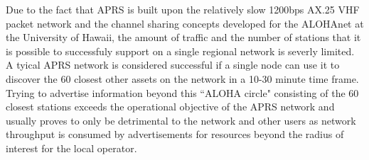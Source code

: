 Due to the fact that APRS is built upon the relatively slow 
1200bps AX.25 VHF packet
network and the channel sharing concepts developed for the ALOHAnet at
the University of Hawaii, the amount of 
traffic and the number of stations that it is possible to successfuly 
support on a single regional network is severly limited. 
A tyical APRS network is considered successful if a single node
can use it to discover the 60 closest other assets on the network in a
10-30 minute time frame. Trying to advertise information beyond this
``ALOHA circle" consisting of the 60 closest stations exceeds the 
operational objective of the APRS network and usually proves to only be 
detrimental to the network and other users as network throughput is 
consumed by advertisements for 
resources beyond the radius of interest for the local operator.


